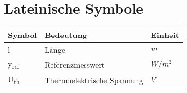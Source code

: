\section*{Lateinische Symbole}
\begin{table}[ht!]
    \centering
\begin{tabular}{m{}m{}m{}}
        \rowcolor{white}
        Symbol               & Bedeutung                  & Einheit \\
        \midrule
        l                    & Länge                      & $m$     \\
        y\textsubscript{ref} & Referenzmesswert           & $W/m^2$ \\
        U\textsubscript{th}  & Thermoelektrische Spannung & $V$     \\
    \end{tabular}
\end{table}
\clearpage
\newpage \vspace*{-1cm}

